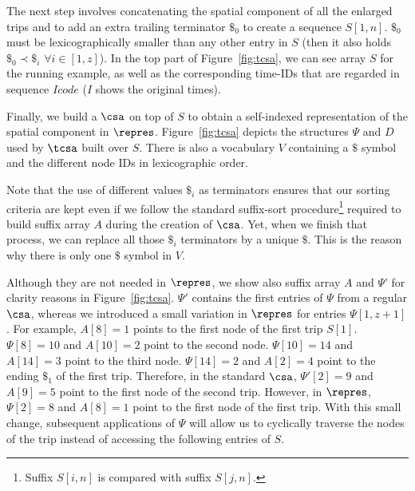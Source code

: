 The next step involves concatenating the spatial component of all the enlarged trips and to add an 
extra trailing terminator $\$_0$ to create a sequence $S[1,n]$. $\$_0$ must be  lexicographically 
smaller than any other entry in $S$ (then it also holds $\$_0 \prec \$_i$ $\forall i \in [1,z]$). In the top part of
Figure~\ref{fig:tcsa}, we can see array $S$ for the running example, as well as the corresponding time-IDs that
are regarded in sequence $Icode$  ($I$ shows the original times).

Finally, we build a $\csa$ on top of $S$ to obtain a self-indexed representation of the spatial component in $\repres$.
Figure~\ref{fig:tcsa} depicts the structures $\Psi$ and $D$ used by $\tcsa$ built over $S$. There is also a vocabulary
$V$ containing a $\$$ symbol and the different node IDs in lexicographic order.

Note that the use of different values $\$_i$ as terminators ensures that our sorting criteria are kept even if we follow the
standard suffix-sort procedure\footnote{Suffix $S[i,n]$ is compared with suffix $S[j,n]$.} 
required to build suffix array $A$ during the creation of $\csa$. Yet, when we finish that
process, we can replace all those $\$_i$ terminators  by a unique $\$$. This is the reason why 
there is only one $\$$ symbol in $V$. 
 


Although they are not needed in $\repres$, we show also suffix array $A$ and $\Psi$' for clarity reasons in Figure~\ref{fig:tcsa}. 
$\Psi'$  contains the first entries of $\Psi$ from a regular $\csa$, whereas we introduced a small variation
in $\repres$ for entries $\Psi[1,z+1]$.  %
For example, $A[8]=1$ points to the first node of the first trip $S[1]$.
$\Psi[8]=10$ and $A[10]=2$ point to the second node.  $\Psi[10]=14$ and $A[14]=3$ point to the third node.
$\Psi[14]=2$ and $A[2]=4$ point to the ending $\$_1$ of the first trip. Therefore, in the standard 
$\csa$, $\Psi'[2]=9$ and $A[9]=5$  point to the first node of the second trip. 
However, in  $\repres$, $\Psi[2]=8$ and $A[8]=1$ point
to the first node of the first trip. With this small change, subsequent applications of $\Psi$ will allow 
us to cyclically traverse the nodes of the trip instead of accessing the following entries of $S$.

